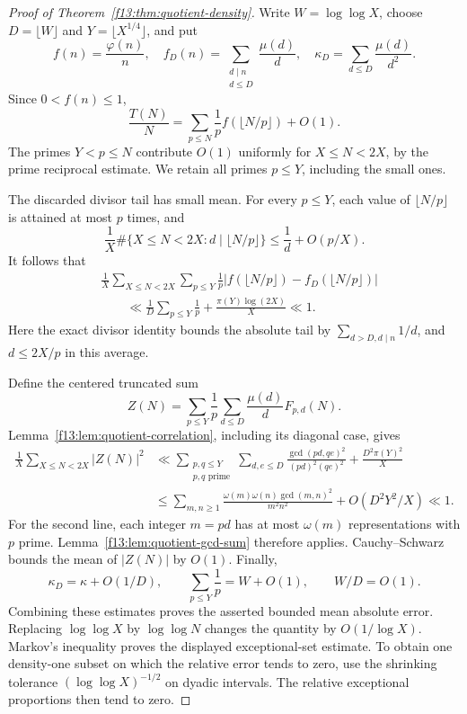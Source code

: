\documentclass[11pt,a4paper]{article}
\theoremstyle{definition}
\theoremstyle{remark}
\numberwithin{equation}{section}
\begin{document}
\begin{proof}[Proof of Theorem~\ref{f13:thm:quotient-density}]
Write $W=\log\log X$, choose $D=\lfloor W\rfloor$ and
$Y=\lfloor X^{1/4}\rfloor$, and put
\[
 f(n)=\frac{\varphi(n)}n,\quad
 f_D(n)=\sum_{\substack{d\mid n\\d\leq D}}\frac{\mu(d)}d,
 \quad \kappa_D=\sum_{d\leq D}\frac{\mu(d)}{d^2}.
\]
Since $0<f(n)\leq1$,
\[
 \frac{T(N)}N
 =\sum_{p\leq N}\frac1p f(\lfloor N/p\rfloor)+O(1).
\]
The primes $Y<p\leq N$ contribute $O(1)$ uniformly for
$X\leq N<2X$, by the prime reciprocal estimate. We retain all primes
$p\leq Y$, including the small ones.

The discarded divisor tail has small mean. For every $p\leq Y$,
each value of $\lfloor N/p\rfloor$ is attained at most $p$ times, and
\[
 \frac1X\#\{X\leq N<2X:d\mid\lfloor N/p\rfloor\}
 \leq \frac1d+O(p/X).
\]
It follows that
\begin{align*}
 &\frac1X\sum_{X\leq N<2X}
 \sum_{p\leq Y}\frac1p
 |f(\lfloor N/p\rfloor)-f_D(\lfloor N/p\rfloor)|\\
 &\qquad\ll
 \frac1D\sum_{p\leq Y}\frac1p
 +\frac{\pi(Y)\log(2X)}X\ll1.
\end{align*}
Here the exact divisor identity bounds the absolute tail by
$\sum_{d>D,d\mid n}1/d$, and $d\leq2X/p$ in this average.

Define the centered truncated sum
\[
 Z(N)=\sum_{p\leq Y}\frac1p
 \sum_{d\leq D}\frac{\mu(d)}d F_{p,d}(N).
\]
Lemma~\ref{f13:lem:quotient-correlation}, including its diagonal case,
gives
\begin{align*}
 \frac1X\sum_{X\leq N<2X}|Z(N)|^2
 &\ll
 \sum_{\substack{p,q\leq Y\\p,q\text{ prime}}}
 \sum_{d,e\leq D}\frac{\gcd(pd,qe)^2}{(pd)^2(qe)^2}
 +\frac{D^2\pi(Y)^2}{X}\\
 &\leq
 \sum_{m,n\geq1}\frac{\omega(m)\omega(n)\gcd(m,n)^2}{m^2n^2}
 +O(D^2Y^2/X)\ll1.
\end{align*}
For the second line, each integer $m=pd$ has at most $\omega(m)$
representations with $p$ prime. Lemma~\ref{f13:lem:quotient-gcd-sum}
therefore applies. Cauchy--Schwarz bounds the mean of $|Z(N)|$ by $O(1)$.
Finally,
\[
 \kappa_D=\kappa+O(1/D),\qquad
 \sum_{p\leq Y}\frac1p=W+O(1),\qquad W/D=O(1).
\]
Combining these estimates proves the asserted bounded mean absolute
error. Replacing $\log\log X$ by $\log\log N$ changes the quantity
by $O(1/\log X)$.
Markov's inequality proves the displayed exceptional-set estimate.
To obtain one density-one subset on which the relative error tends to
zero, use the shrinking tolerance $(\log\log X)^{-1/2}$ on dyadic
intervals. The relative exceptional proportions then tend to zero.
\end{proof}
\end{document}
